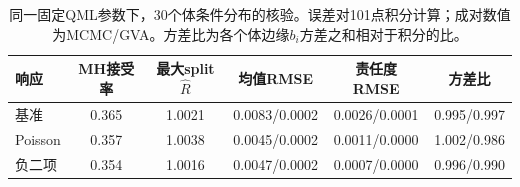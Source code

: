 \begin{table}[H]\centering\small
\caption{同一固定QML参数下，30个体条件分布的核验。误差对101点积分计算；成对数值为MCMC/GVA。方差比为各个体边缘$b_i$方差之和相对于积分的比。}
\begin{tabular}{lccccc}\toprule
响应 & MH接受率 & 最大split $\widehat R$ & 均值RMSE & 责任度RMSE & 方差比\\\midrule
基准 & 0.365 & 1.0021 & 0.0083/0.0002 & 0.0026/0.0001 & 0.995/0.997 \\
Poisson & 0.357 & 1.0038 & 0.0045/0.0002 & 0.0011/0.0000 & 1.002/0.986 \\
负二项 & 0.354 & 1.0016 & 0.0047/0.0002 & 0.0007/0.0000 & 0.996/0.990 \\
\bottomrule\end{tabular}\end{table}
